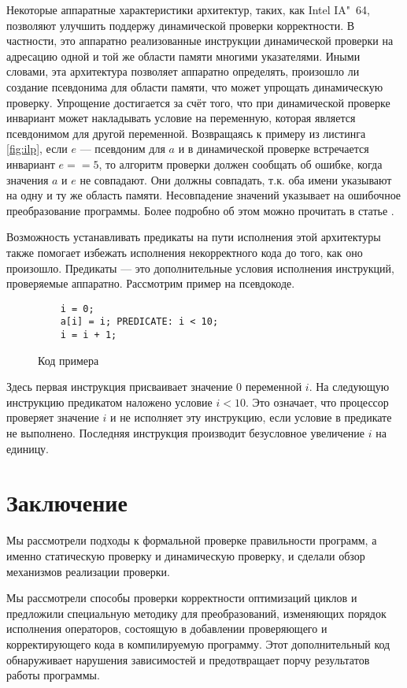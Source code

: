 Некоторые аппаратные характеристики архитектур, таких, как Intel IA"~64, позволяют улучшить поддержу динамической проверки корректности. В частности, это аппаратно реализованные инструкции динамической проверки на адресацию одной и той же области памяти многими указателями. Иными словами, эта архитектура позволяет аппаратно определять, произошло ли создание псевдонима для области памяти, что может упрощать динамическую проверку. Упрощение достигается за счёт того, что при динамической проверке инвариант может накладывать условие на переменную, которая является псевдонимом для другой переменной. Возвращаясь к примеру из листинга \ref{fig:ilp}, если $e$ --- псевдоним для $a$ и в динамической проверке встречается инвариант $e == 5$, то алгоритм проверки должен сообщать об ошибке, когда значения $a$ и $e$ не совпадают. Они должны совпадать, т.к. оба имени указывают на одну и ту же область памяти. Несовпадение значений указывает на ошибочное преобразование программы. Более подробно об этом можно прочитать в статье \cite{GHCP02}.

Возможность устанавливать предикаты на пути исполнения этой архитектуры также помогает избежать исполнения некорректного кода до того, как оно произошло. Предикаты --- это дополнительные условия исполнения инструкций, проверяемые аппаратно. Рассмотрим пример на псевдокоде.

\begin{figure}[H]
    \begin{verbatim}
    i = 0;
    a[i] = i; PREDICATE: i < 10;
    i = i + 1;
    \end{verbatim}
    \label{fig:predicate}
    \caption{Код примера}
\end{figure}

Здесь первая инструкция присваивает значение $0$ переменной $i$. На следующую инструкцию предикатом наложено условие $i < 10$. Это означает, что процессор проверяет значение $i$ и не исполняет эту инструкцию, если условие в предикате не выполнено. Последняя инструкция производит безусловное увеличение $i$ на единицу.

\section*{Заключение}
%

Мы рассмотрели подходы к формальной проверке правильности программ, а именно статическую проверку и динамическую проверку, и сделали обзор механизмов реализации проверки.

Мы рассмотрели способы проверки корректности оптимизаций циклов и предложили специальную методику для преобразований, изменяющих порядок исполнения операторов, состоящую в добавлении проверяющего и корректирующего кода в компилируемую программу. Этот дополнительный код обнаруживает нарушения зависимостей и предотвращает порчу результатов работы программы.